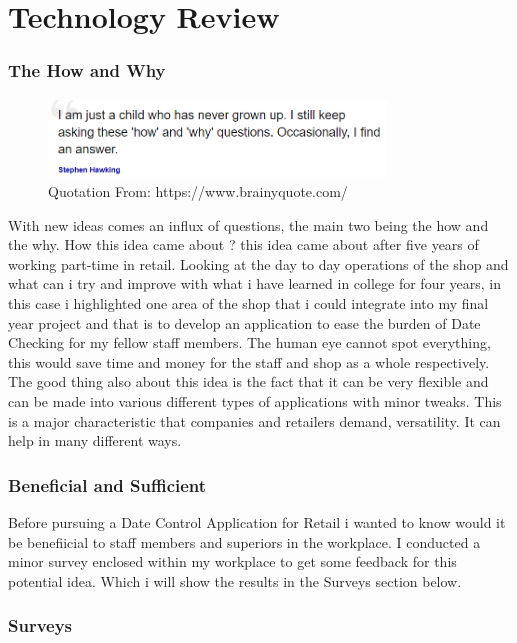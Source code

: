 \chapter{Technology Review}

\subsection{The How and Why}
\begin{figure}[h!]
	\caption{Quotation From: https://www.brainyquote.com/}
	\label{image:quote1}
	\centering
	\includegraphics[width=0.8\textwidth]{images/quote1.PNG}
\end{figure}
With new ideas comes an influx of questions, the main two being the how and the why. How this idea came about ? this idea came about after five years of working part-time in retail. Looking at the day to day operations of the shop and what can i try and improve with what i have learned in college for four years, in this case i highlighted one area of the shop that i could integrate into my final year project and that is to develop an application to ease the burden of Date Checking for my fellow staff members. The human eye cannot spot everything, this would save time and money for the staff and shop as a whole respectively. The good thing also about this idea is the fact that it can be very flexible and can be made into various different types of applications with minor tweaks. This is a major characteristic that companies and retailers demand, versatility. It can help in many different ways. %

\subsection{Beneficial and Sufficient}
Before pursuing a Date Control Application for Retail i wanted to know would it be benefiicial to staff members and superiors in the workplace. I conducted a minor survey enclosed within my workplace to get some feedback for this potential idea. Which i will show the results in the Surveys section below. %

\subsection{Surveys}

